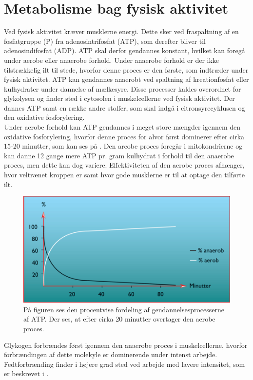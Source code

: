 \section{Metabolisme bag fysisk aktivitet}
Ved fysisk aktivitet kræver musklerne energi. Dette sker ved fraspaltning af en fosfatgruppe (P) fra adenosintrifosfat (ATP), som derefter bliver til adenosindifosfat (ADP). ATP skal derfor gendannes konstant, hvilket kan foregå under aerobe eller anaerobe forhold. Under anaerobe forhold er der ikke tilstrækkelig ilt til stede, hvorfor denne proces er den første, som indtræder under fysisk aktivitet. ATP kan gendannes anaerobt ved spaltning af kreationfosfat eller kulhydrater under dannelse af mælkesyre. Disse processer kaldes overordnet for glykolysen og finder sted i cytosolen i muskelcellerne ved fysisk aktivitet. Der dannes ATP samt en række andre stoffer, som skal indgå i citronsyrecyklusen og den oxidative fosforylering.\citep{Martini2012,Engelbreth2010} \\
Under aerobe forhold kan ATP gendannes i meget store mængder igennem den oxidative fosforylering, hvorfor denne proces for alvor først dominerer efter cirka 15-20 minutter, som kan ses på . Den areobe proces foregår i mitokondrierne og kan danne 12 gange mere ATP pr. gram kulhydrat i forhold til den anaerobe proces, men dette kan dog variere. Effektiviteten af den aerobe proces afhænger, hvor veltrænet kroppen er samt hvor gode musklerne er til at optage den tilførte ilt.\citep{Engelbreth2010,Martini2012,Stanfield2013} 
\begin{figure}[H]
	\centering
	\includegraphics[scale=0.65]{figures/aProblemanalyse/Metabolisme.png}
	\caption{På figuren ses den procentvise fordeling af gendannelsesprocesserne af ATP. Der ses, at efter cirka 20 minutter overtager den aerobe proces.\citep{Engelbreth2010}}
	\label{fig:Metabolisme}
\end{figure}
Glykogen forbrændes først igennem den anaerobe proces i muskelcellerne, hvorfor forbrændingen af dette molekyle er dominerende under intenst arbejde. Fedtforbrænding finder i højere grad sted ved arbejde med lavere intensitet, som er beskrevet i .\citep{Martini2012,Stanfield2013,Engelbreth2010}
